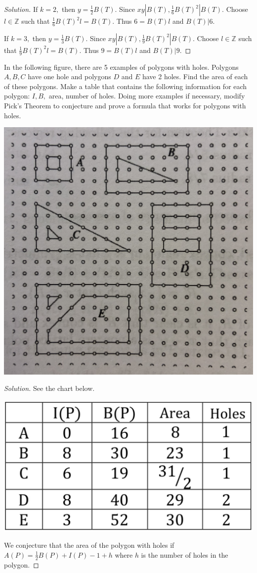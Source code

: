 \documentclass[12pt]{article}
\newcommand{\Z}{\mathbb{Z}}
\newenvironment{exercise}[2][Exercise]{\begin{trivlist}
        \item[\hskip \labelsep {\bfseries #1}\hskip \labelsep {\bfseries #2.}]}{\end{trivlist}}
\newenvironment{challenge}[2][Challenge Problem]{\begin{trivlist}
        \item[\hskip \labelsep {\bfseries #1}\hskip \labelsep {\bfseries #2.}]}{\end{trivlist}}
\newenvironment{solution}
        {\begin{proof}[Solution]}
                    {\end{proof}}
\begin{document}
\begin{exercise}{78}
\begin{solution}
        If \( k = 2, \) then \( y = \frac{1}{2} B(T) . \) Since \( xy | B(T) , \frac{1}{6} B(T)^{2} | B(T) .\) Choose \( l \in \Z \) such that \( \frac{1}{6} B(T)^{2} l = B(T) . \) Thus \( 6 = B(T) l\) and \( B(T) | 6. \)

        If \( k = 3, \) then \( y = \frac{1}{3} B(T) . \) Since \( xy | B(T) , \frac{1}{9} B(T)^{2} | B(T) .\) Choose \( l \in \Z \) such that \( \frac{1}{9} B(T)^{2} l = B(T) . \) Thus \( 9 = B(T) l\) and \( B(T) | 9. \)


    \end{solution}
\end{exercise}

\begin{challenge}{2}
    In the following figure, there are 5 examples of polygons with holes. Polygons \( A,B,C \) have one hole and polygons \( D \) and \( E \) have 2 holes. Find the area of each of these polygons. Make a table that contains the following information for each polygon: \( I, B, \) area, number of holes. Doing more examples if necessary, modify Pick's Theorem to conjecture and prove a formula that works for polygons with holes.
    \begin{center}
        \includegraphics[width = .6\linewidth]{Challenge2-2}
    \end{center}
    \begin{solution}
        See the chart below.
    \begin{center}
        \includegraphics[width = .4\linewidth]{Challenge2-1}
    \end{center}
        We conjecture that the area of the polygon with holes if \( A(P) = \frac{1}{2} B(P) + I(P) -1 + h \) where \( h \) is the number of holes in the polygon.


\end{solution}
\end{challenge}
\end{document}
